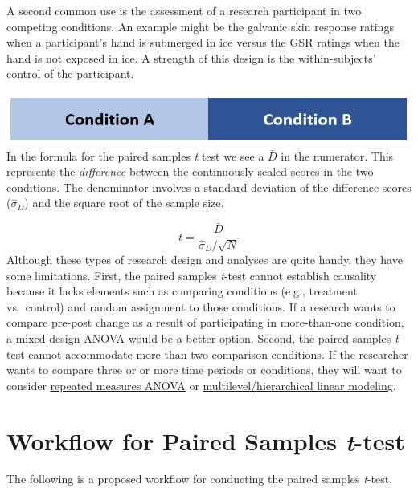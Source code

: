 \documentclass[
  11pt,
]{book}
\begin{document}
A second common use is the assessment of a research participant in two competing conditions. An example might be the galvanic skin response ratings when a participant's hand is submerged in ice versus the GSR ratings when the hand is not exposed in ice. A strength of this design is the within-subjects' control of the participant.

\includegraphics{images/ttests/conditions_paired.jpg}
In the formula for the paired samples \emph{t} test we see a \(\bar{D}\) in the numerator. This represents the \emph{difference} between the continuously scaled scores in the two conditions. The denominator involves a standard deviation of the difference scores (\(\hat\sigma_D\)) and the square root of the sample size.

\[t = \frac{\bar{D}}{\hat\sigma_D / \sqrt{N}}\]
Although these types of research design and analyses are quite handy, they have some limitations. First, the paired samples \emph{t}-test cannot establish causality because it lacks elements such as comparing conditions (e.g., treatment vs.~control) and random assignment to those conditions. If a research wants to compare pre-post change as a result of participating in more-than-one condition, a \protect\hyperlink{Mixed}{mixed design ANOVA} would be a better option. Second, the paired samples \emph{t}-test cannot accommodate more than two comparison conditions. If the researcher wants to compare three or or more time periods or conditions, they will want to consider \protect\hyperlink{Repeated}{repeated measures ANOVA} or \href{https://lhbikos.github.io/MultilevelModeling/}{multilevel/hierarchical linear modeling}.

\hypertarget{workflow-for-paired-samples-t-test}{%
\section{\texorpdfstring{Workflow for Paired Samples \emph{t}-test}{Workflow for Paired Samples t-test}}\label{workflow-for-paired-samples-t-test}}

The following is a proposed workflow for conducting the paired samples \emph{t}-test.
\end{document}
